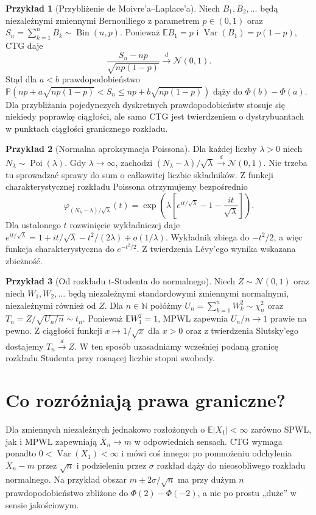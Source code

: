 \documentclass[11pt,a4paper,oneside]{report}
\numberwithin{equation}{chapter}
\theoremstyle{plain}
\theoremstyle{definition}
\newtheorem{przyklad}{Przykład}[chapter]
\theoremstyle{remark}
\newcommand{\N}{\mathbb{N}}
\newcommand{\Prob}{\mathbb{P}}
\newcommand{\E}{\mathbb{E}}
\newcommand{\Var}{\operatorname{Var}}
\newcommand{\Bin}{\operatorname{Bin}}
\newcommand{\Poi}{\operatorname{Poi}}
\newcommand{\Normal}{\mathcal{N}}
\begin{document}
\begin{przyklad}[Przybliżenie de Moivre'a--Laplace'a]
Niech $B_1,B_2,\ldots$ będą niezależnymi zmiennymi
Bernoulliego z parametrem $p\in(0,1)$ oraz
$S_n=\sum_{k=1}^nB_k\sim\Bin(n,p)$.
Ponieważ $\E B_1=p$ i $\Var(B_1)=p(1-p)$,
CTG daje
\[
\frac{S_n-np}{\sqrt{np(1-p)}}\xrightarrow d\Normal(0,1).
\]
Stąd dla $a<b$ prawdopodobieństwo
$\Prob(np+a\sqrt{np(1-p)}<S_n\leq
np+b\sqrt{np(1-p)})$ dąży do $\Phi(b)-\Phi(a)$.
Dla przybliżania pojedynczych dyskretnych
prawdopodobieństw stosuje się niekiedy poprawkę ciągłości,
ale samo CTG jest twierdzeniem o dystrybuantach
w punktach ciągłości granicznego rozkładu.
\end{przyklad}

\begin{przyklad}[Normalna aproksymacja Poissona]
Dla każdej liczby $\lambda>0$ niech
$N_\lambda\sim\Poi(\lambda)$. Gdy $\lambda\to\infty$,
zachodzi
$(N_\lambda-\lambda)/\sqrt\lambda\xrightarrow d\Normal(0,1)$.
Nie trzeba tu sprowadzać sprawy do sum o całkowitej
liczbie składników. Z funkcji charakterystycznej
rozkładu Poissona otrzymujemy bezpośrednio
\[
\varphi_{(N_\lambda-\lambda)/\sqrt\lambda}(t)
=\exp\!\left(\lambda\left[e^{it/\sqrt\lambda}
-1-\frac{it}{\sqrt\lambda}\right]\right).
\]
Dla ustalonego $t$ rozwinięcie wykładniczej daje
$e^{it/\sqrt\lambda}=1+it/\sqrt\lambda
-t^2/(2\lambda)+o(1/\lambda)$.
Wykładnik zbiega do $-t^2/2$, a więc
funkcja charakterystyczna do $e^{-t^2/2}$.
Z twierdzenia Lévy'ego wynika wskazana zbieżność.
\end{przyklad}

\begin{przyklad}[Od rozkładu t-Studenta do normalnego]
Niech $Z\sim\Normal(0,1)$ oraz niech
$W_1,W_2,\ldots$ będą niezależnymi standardowymi
zmiennymi normalnymi, niezależnymi również od $Z$.
Dla $n\in\N$ połóżmy
$U_n=\sum_{k=1}^nW_k^2\sim\chi_n^2$ oraz
$T_n=Z/\sqrt{U_n/n}\sim t_n$.
Ponieważ $\E W_1^2=1$, MPWL zapewnia
$U_n/n\to1$ prawie na pewno. Z ciągłości funkcji
$x\mapsto1/\sqrt x$ dla $x>0$ oraz z twierdzenia
Slutsky'ego dostajemy $T_n\xrightarrow d Z$.
W ten sposób uzasadniamy wcześniej podaną granicę
rozkładu Studenta przy rosnącej liczbie stopni swobody.
\end{przyklad}

\section{Co rozróżniają prawa graniczne?}

Dla zmiennych niezależnych jednakowo rozłożonych o
$\E|X_1|<\infty$ zarówno SPWL, jak i MPWL zapewniają
$\overline X_n\to m$ w odpowiednich sensach.
CTG wymaga ponadto $0<\Var(X_1)<\infty$ i mówi
coś innego: po pomnożeniu odchylenia $\overline X_n-m$
przez $\sqrt n$ i podzieleniu przez $\sigma$ rozkład
dąży do nieosobliwego rozkładu normalnego.
Na przykład obszar $m\pm 2\sigma/\sqrt n$ ma
przy dużym $n$ prawdopodobieństwo zbliżone do
$\Phi(2)-\Phi(-2)$, a nie po prostu „duże” w sensie
jakościowym.
\end{document}
